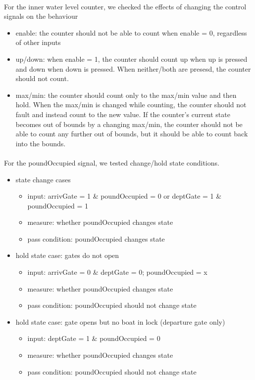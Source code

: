 \documentclass{article}
\begin{document}
      \paragraph{} For the inner water level counter, we checked the effects of changing the control signals on the behaviour
      \begin{itemize}
        \item enable: the counter should not be able to count when enable = 0, regardless of other inputs
        \item up/down: when enable = 1, the counter should count up when up is pressed and down when down is pressed. When neither/both are presesd, the counter should not count.
        \item max/min: the counter should count only to the max/min value and then hold. When the max/min is changed while counting, the counter should not fault and instead count to the new value. If the counter's current state becomes out of bounds by a changing max/min, the counter should not be able to count any further out of bounds, but it should be able to count back into the bounds.
      \end{itemize}

      \paragraph{} For the poundOccupied signal, we tested change/hold state conditions.
      \begin{itemize}
        \item state change cases
        \begin{itemize}
          \item input: arrivGate = 1 \& poundOccupied = 0 or deptGate = 1 \& poundOccupied = 1
          \item measure: whether poundOccupied changes state
          \item pass condition: poundOccupied changes state
        \end{itemize}

        \item hold state case: gates do not open
        \begin{itemize}
          \item input: arrivGate = 0 \& deptGate = 0; poundOccupied = x
          \item measure: whether poundOccupied changes state
          \item pass condition: poundOccupied should not change state
        \end{itemize}

        \item hold state case: gate opens but no boat in lock (departure gate only)
        \begin{itemize}
          \item input: deptGate = 1 \& poundOccupied = 0
          \item measure: whether poundOccupied changes state
          \item pass condition: poundOccupied should not change state
        \end{itemize}
      \end{itemize}
\end{document}
